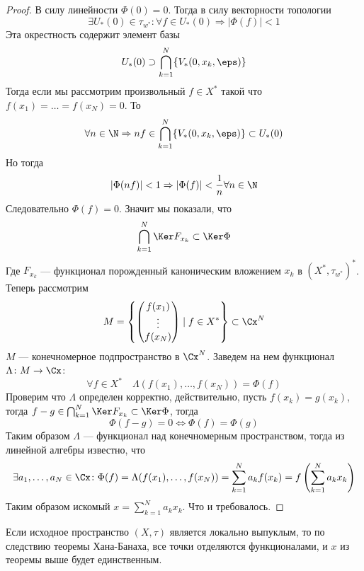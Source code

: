 \begin{proof}
	В силу линейности $\Phi(0) = 0$. Тогда в силу векторности топологии 
	$$
	\exists U_*(0) \in \tau_{w^*}\colon \forall f \in U_*(0) \Rightarrow |\Phi(f)| < 1
	$$
	Эта окрестность содержит элемент базы
	$$
	U_*(0) \supset \bigcap_{k = 1}^N\{V_*(0, x_k, \eps)\}
	$$
	Тогда если мы рассмотрим произвольный $f \in X^*$ такой что $f(x_1) = \dots = f(x_N) = 0$. То
	$$
	\forall n \in \N \Rightarrow nf \in \bigcap_{k = 1}^N\{V_*(0, x_k, \eps)\} \subset U_*(0)
	$$
	Но тогда 
	$$
	|\Phi(nf)| < 1 \Rightarrow |\Phi(f)| < \frac{1}{n} \forall n \in \N
	$$
	Следовательно $\Phi(f) = 0$. Значит мы показали, что 
	$$
	\bigcap_{k=1}^N \Ker F_{x_k} \subset \Ker \Phi
	$$
	Где $F_{x_k}$ --- функционал порожденный каноническим вложением $x_k$ в $(X^*,\tau_{w^*})^*$. Теперь рассмотрим
	$$
	M = \left\{\begin{pmatrix}
		f(x_1) \\
		\vdots \\
		f(x_N)
	\end{pmatrix} \mid f \in X^*\right\} \subset \Cx^N
	$$
	$M$ --- конечномерное подпространство в $\Cx^N$. Заведем на нем функционал $\Lambda \colon M \to \Cx$:
	$$
\forall f \in X^* \quad	\Lambda(f(x_1), \dots, f(x_N)) = \Phi(f)
	$$
	Проверим что $\Lambda$ определен корректно, действительно, пусть $f(x_k) = g(x_k)$, тогда $f - g \in \bigcap_{k=1}^N \Ker F_{x_k} \subset \Ker \Phi$, тогда 
	$$
	\Phi(f -g)  = 0 \Leftrightarrow \Phi(f) = \Phi(g)
	$$
	Таким образом $\Lambda$ --- функционал над конечномерным пространством, тогда из линейной алгебры известно, что 
	$$
	\exists a_1, \dots, a_N \in \Cx\colon \Phi(f) = \Lambda(f(x_1), \dots, f(x_N)) = \sum_{k=1}^N a_k f(x_k) = f\left(\sum_{k=1}^N a_k x_k\right)
	$$
	Таким образом искомый $x = \sum_{k=1}^N a_k x_k$. Что и требовалось.
\end{proof}
\begin{remark}
	Если исходное пространство $(X,\tau)$ является локально выпуклым, то по следствию теоремы Хана-Банаха, все точки отделяются функционалами, и $x$ из теоремы выше будет единственным.
\end{remark}

